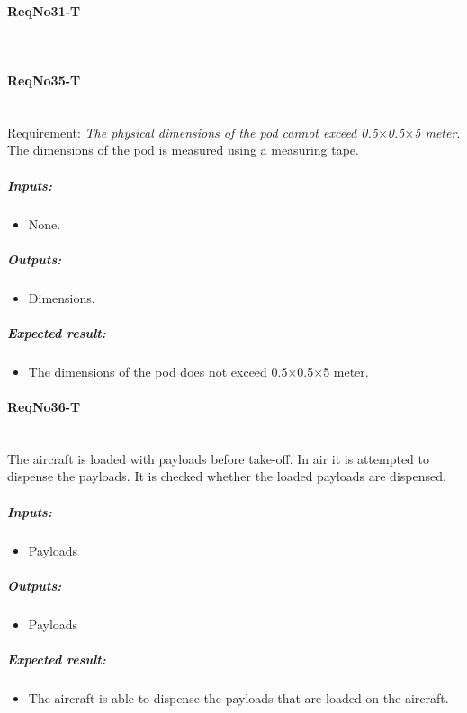 \paragraph{ReqNo31-T}\mbox{}\\ %

\paragraph{ReqNo35-T}\mbox{}\\ %
Requirement: \textit{The physical dimensions of the pod cannot exceed 0.5$\times$0.5$\times$5 meter.}
\\
The dimensions of the pod is measured using a measuring tape.

	\subparagraph{Inputs:}
	\begin{itemize}
	\item None.
	\end{itemize}
	\subparagraph{Outputs:}
	\begin{itemize}
	\item Dimensions.
	\end{itemize}
	\subparagraph{Expected result:}
	\begin{itemize}
	\item The dimensions of the pod does not exceed 0.5$\times$0.5$\times$5 meter.
	\end{itemize}


\paragraph{ReqNo36-T}\mbox{}\\ %
The aircraft is loaded with payloads before take-off. In air it is attempted to dispense the payloads. It is checked whether the loaded payloads are dispensed.
\\
	\subparagraph{Inputs:}
	\begin{itemize}
	\item Payloads
	\end{itemize}
	\subparagraph{Outputs:}
	\begin{itemize}
	\item Payloads
	\end{itemize}
	\subparagraph{Expected result:}
	\begin{itemize}
	\item The aircraft is able to dispense the payloads that are loaded on the aircraft.
	\end{itemize}


